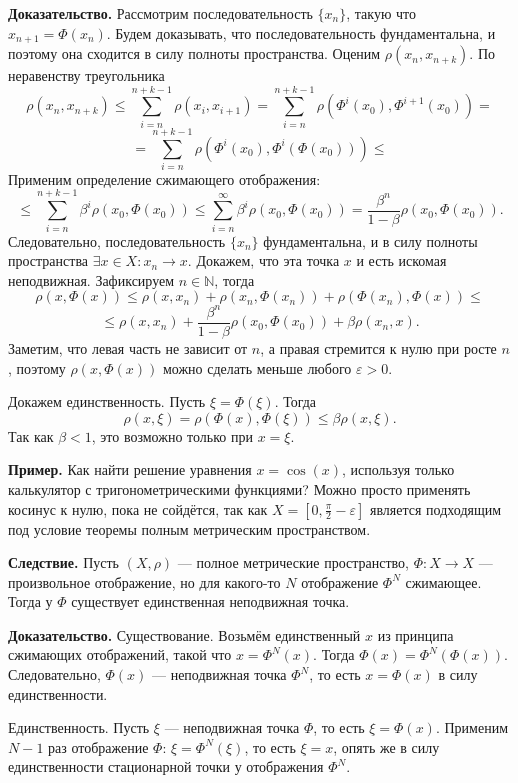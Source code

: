 \textbf{Доказательство.} Рассмотрим последовательность $\{x_n\}$, такую что $x_{n+1} = \Phi(x_n)$.
Будем доказывать, что последовательность фундаментальна, и поэтому она сходится в силу полноты пространства.
Оценим $\rho(x_n, x_{n+k})$. По неравенству треугольника
\[
    \rho(x_n, x_{n+k}) \le \sum_{i=n}^{n+k-1} \rho(x_i, x_{i+1}) = 
    \sum_{i=n}^{n+k-1} \rho(\Phi^i(x_0), \Phi^{i+1}(x_0)) =
\]
\[
    = \sum_{i=n}^{n+k-1} \rho(\Phi^i(x_0), \Phi^{i}(\Phi(x_0))) \le
\]
Применим определение сжимающего отображения:
\[
    \le \sum_{i=n}^{n+k-1} \beta^i \rho(x_0, \Phi(x_0))
    \le \sum_{i=n}^{\infty} \beta^i \rho(x_0, \Phi(x_0))
    = \frac{\beta^n}{1-\beta} \rho(x_0, \Phi(x_0)).
\]
Следовательно, последовательность $\{x_n\}$ фундаментальна, и в силу полноты пространства $\exists x \in X: x_n \to x$.
Докажем, что эта точка $x$ и есть искомая неподвижная.
Зафиксируем $n \in \mathbb N$, тогда
\[
    \rho(x, \Phi(x)) \le \rho(x, x_n) + \rho(x_n, \Phi(x_n)) + \rho(\Phi(x_n), \Phi(x)) \le
\]
\[
    \le \rho(x, x_n) + \frac{\beta^n}{1 - \beta} \rho(x_0, \Phi(x_0)) + \beta \rho(x_n, x).
\]
Заметим, что левая часть не зависит от $n$, а правая стремится к нулю при росте $n$, поэтому $\rho(x, \Phi(x))$ можно сделать меньше любого $\varepsilon > 0$.

Докажем единственность. Пусть $\xi = \Phi(\xi)$.
Тогда
\[
    \rho(x, \xi) = \rho(\Phi(x), \Phi(\xi)) \le \beta \rho(x, \xi).
\]
Так как $\beta < 1$, это возможно только при $x = \xi$.

\QED

\textbf{Пример.} Как найти решение уравнения $x = \cos(x)$, используя только калькулятор с тригонометрическими функциями?
Можно просто применять косинус к нулю, пока не сойдётся, так как $X = [0, \frac{\pi}{2} - \varepsilon]$ является подходящим под условие теоремы полным метрическим пространством.

\textbf{Следствие.} Пусть $(X, \rho)$ --- полное метрические пространство, $\Phi: X \to X$ --- произвольное отображение, но для какого-то $N$ отображение $\Phi^N$ сжимающее.
Тогда у $\Phi$ существует единственная неподвижная точка.

\textbf{Доказательство.} Существование. Возьмём единственный $x$ из принципа сжимающих отображений, такой что $x = \Phi^N(x)$.
Тогда $\Phi(x) = \Phi^N(\Phi(x))$.
Следовательно, $\Phi(x)$ --- неподвижная точка $\Phi^N$, то есть $x = \Phi(x)$ в силу единственности.

Единственность. Пусть $\xi$ --- неподвижная точка $\Phi$, то есть $\xi = \Phi(x)$.
Применим $N - 1$ раз отображение $\Phi$: $\xi = \Phi^N(\xi)$, то есть $\xi = x$, опять же в силу единственности стационарной точки у отображения $\Phi^N$.

